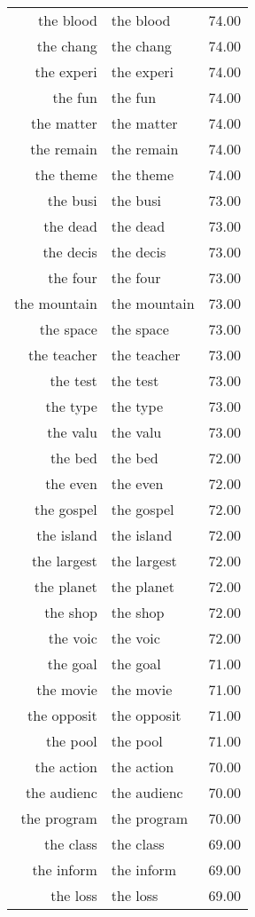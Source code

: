 \begin{table}[ht]
\begin{tabular}{rlr}
  the blood & the blood & 74.00 \\ 
  the chang & the chang & 74.00 \\ 
  the experi & the experi & 74.00 \\ 
  the fun & the fun & 74.00 \\ 
  the matter & the matter & 74.00 \\ 
  the remain & the remain & 74.00 \\ 
  the theme & the theme & 74.00 \\ 
  the busi & the busi & 73.00 \\ 
  the dead & the dead & 73.00 \\ 
  the decis & the decis & 73.00 \\ 
  the four & the four & 73.00 \\ 
  the mountain & the mountain & 73.00 \\ 
  the space & the space & 73.00 \\ 
  the teacher & the teacher & 73.00 \\ 
  the test & the test & 73.00 \\ 
  the type & the type & 73.00 \\ 
  the valu & the valu & 73.00 \\ 
  the bed & the bed & 72.00 \\ 
  the even & the even & 72.00 \\ 
  the gospel & the gospel & 72.00 \\ 
  the island & the island & 72.00 \\ 
  the largest & the largest & 72.00 \\ 
  the planet & the planet & 72.00 \\ 
  the shop & the shop & 72.00 \\ 
  the voic & the voic & 72.00 \\ 
  the goal & the goal & 71.00 \\ 
  the movie & the movie & 71.00 \\ 
  the opposit & the opposit & 71.00 \\ 
  the pool & the pool & 71.00 \\ 
  the action & the action & 70.00 \\ 
  the audienc & the audienc & 70.00 \\ 
  the program & the program & 70.00 \\ 
  the class & the class & 69.00 \\ 
  the inform & the inform & 69.00 \\ 
  the loss & the loss & 69.00 \\ 

\end{tabular}
\end{table}
